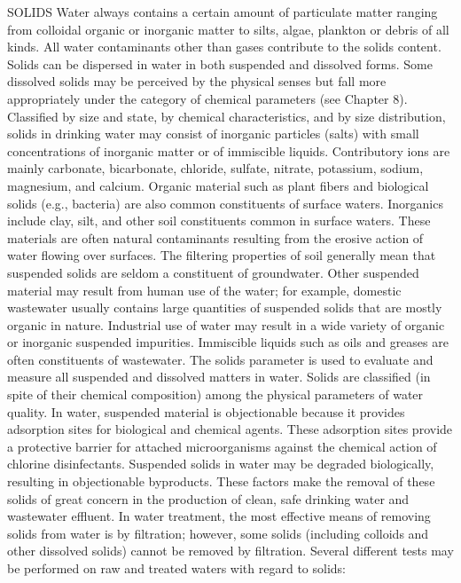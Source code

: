 \documentclass{article}
\begin{document}
SOLIDS Water always contains a certain amount of particulate matter
ranging from colloidal organic or inorganic matter to silts, algae,
plankton or debris of all kinds. All water contaminants other than gases
contribute to the solids content. Solids can be dispersed in water in
both suspended and dissolved forms. Some dissolved solids may be
perceived by the physical senses but fall more appropriately under the
category of chemical parameters (see Chapter 8). Classified by size and
state, by chemical characteristics, and by size distribution, solids in
drinking water may consist of inorganic particles (salts) with small
concentrations of inorganic matter or of immiscible liquids.
Contributory ions are mainly carbonate, bicarbonate, chloride, sulfate,
nitrate, potassium, sodium, magnesium, and calcium. Organic material
such as plant fibers and biological solids (e.g., bacteria) are also
common constituents of surface waters. Inorganics include clay, silt,
and other soil constituents common in surface waters. These materials
are often natural contaminants resulting from the erosive action of
water flowing over surfaces. The filtering properties of soil generally
mean that suspended solids are seldom a constituent of groundwater.
Other suspended material may result from human use of the water; for
example, domestic wastewater usually contains large quantities of
suspended solids that are mostly organic in nature. Industrial use of
water may result in a wide variety of organic or inorganic suspended
impurities. Immiscible liquids such as oils and greases are often
constituents of wastewater. The solids parameter is used to evaluate and
measure all suspended and dissolved matters in water. Solids are
classified (in spite of their chemical composition) among the physical
parameters of water quality. In water, suspended material is
objectionable because it provides adsorption sites for biological and
chemical agents. These adsorption sites provide a protective barrier for
attached microorganisms against the chemical action of chlorine
disinfectants. Suspended solids in water may be degraded biologically,
resulting in objectionable byproducts. These factors make the removal of
these solids of great concern in the production of clean, safe drinking
water and wastewater effluent. In water treatment, the most effective
means of removing solids from water is by filtration; however, some
solids (including colloids and other dissolved solids) cannot be removed
by filtration. Several different tests may be performed on raw and
treated waters with regard to solids:
\end{document}
